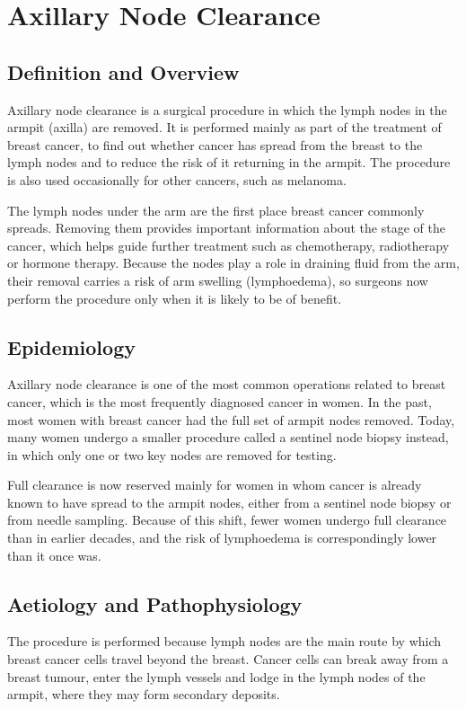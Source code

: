 \chapter{Axillary Node Clearance}

\section*{Definition and Overview}
Axillary node clearance is a surgical procedure in which the lymph nodes in the armpit (axilla) are removed. It is performed mainly as part of the treatment of breast cancer, to find out whether cancer has spread from the breast to the lymph nodes and to reduce the risk of it returning in the armpit. The procedure is also used occasionally for other cancers, such as melanoma.

The lymph nodes under the arm are the first place breast cancer commonly spreads. Removing them provides important information about the stage of the cancer, which helps guide further treatment such as chemotherapy, radiotherapy or hormone therapy. Because the nodes play a role in draining fluid from the arm, their removal carries a risk of arm swelling (lymphoedema), so surgeons now perform the procedure only when it is likely to be of benefit.

\section*{Epidemiology}
Axillary node clearance is one of the most common operations related to breast cancer, which is the most frequently diagnosed cancer in women. In the past, most women with breast cancer had the full set of armpit nodes removed. Today, many women undergo a smaller procedure called a sentinel node biopsy instead, in which only one or two key nodes are removed for testing.

Full clearance is now reserved mainly for women in whom cancer is already known to have spread to the armpit nodes, either from a sentinel node biopsy or from needle sampling. Because of this shift, fewer women undergo full clearance than in earlier decades, and the risk of lymphoedema is correspondingly lower than it once was.

\section*{Aetiology and Pathophysiology}
The procedure is performed because lymph nodes are the main route by which breast cancer cells travel beyond the breast. Cancer cells can break away from a breast tumour, enter the lymph vessels and lodge in the lymph nodes of the armpit, where they may form secondary deposits.

